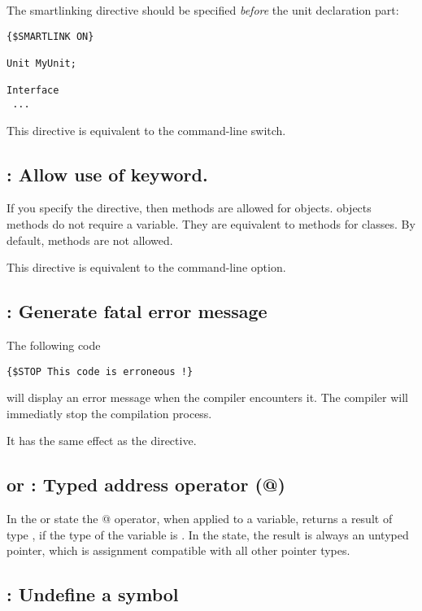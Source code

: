 \documentclass{report}
\begin{document}
The smartlinking directive should be specified {\em before} the unit
declaration part:
\begin{verbatim}
{$SMARTLINK ON}

Unit MyUnit;

Interface
 ...
\end{verbatim}

This directive is equivalent to the  command-line switch.

\subsection{ : Allow use of  keyword.}
If you specify the  directive, then 
methods are allowed for objects.  objects methods do not require
a  variable. They are equivalent to  methods for
classes. By default,  methods are not allowed.

This directive is equivalent to the  command-line option.

\subsection{ : Generate fatal error message}

The following code
\begin{verbatim}
{$STOP This code is erroneous !}
\end{verbatim}
will display an error message when the compiler encounters it.
The compiler will immediatly stop the compilation process.

It has the same effect as the  directive.

\subsection{ or  : Typed address operator (@)}

In the  or  state the @ operator,
when applied to a variable, returns a result of type , if the
type of the variable is . In the  state, the result is
always an untyped pointer, which is assignment compatible with all other
pointer types.

\subsection{ : Undefine a symbol}
\end{document}

